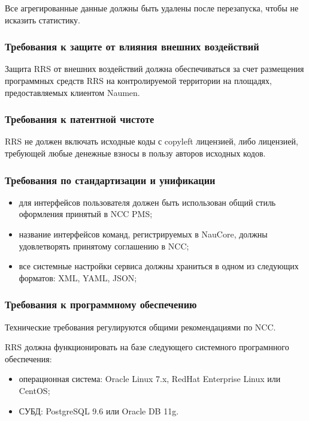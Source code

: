 Все агрегированные данные должны быть удалены после перезапуска, чтобы не исказить статистику.

\subsubsection{Требования к защите от влияния внешних воздействий}

Защита RRS от внешних воздействий должна обеспечиваться за счет размещения программных средств RRS на контролируемой территории на площадях, предоставляемых клиентом Naumen.

\subsubsection{Требования к патентной чистоте}

RRS не должен включать исходные коды с copyleft лицензией, либо лицензией, требующей любые денежные взносы в пользу авторов исходных кодов.

\subsubsection{Требования по стандартизации и унификации}

\begin{itemize}
    \item для интерфейсов пользователя должен быть использован общий стиль оформления принятый в NCC PMS;
    \item название интерфейсов команд, регистрируемых в NauCore, должны удовлетворять принятому соглашению в NCC;
    \item все системные настройки сервиса должны храниться в одном из следующих форматов: XML, YAML, JSON\@;
\end{itemize}

\subsubsection{Требования к программному обеспечению}
\label{subsubsec:требования-к-программному-обеспечению}

Технические требования регулируются общими рекомендациями по NCC\@.

RRS должна функционировать на базе следующего системного програмнного обеспечения:
\begin{itemize}
    \item операционная система: Oracle Linux 7.x, RedHat Enterprise Linux или CentOS;
    \item СУБД: PostgreSQL 9.6 или Oracle DB 11g.
\end{itemize}

